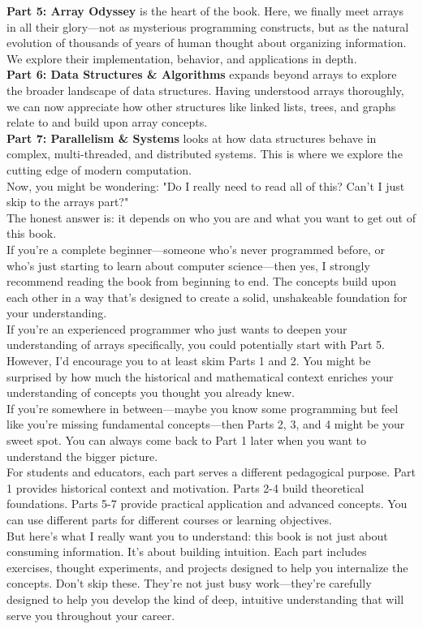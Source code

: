 \textbf{Part 5: Array Odyssey} is the heart of the book. Here, we finally meet arrays in all their glory—not as mysterious programming constructs, but as the natural evolution of thousands of years of human thought about organizing information. We explore their implementation, behavior, and applications in depth.\\
\textbf{Part 6: Data Structures \& Algorithms} expands beyond arrays to explore the broader landscape of data structures. Having understood arrays thoroughly, we can now appreciate how other structures like linked lists, trees, and graphs relate to and build upon array concepts.\\
\textbf{Part 7: Parallelism \& Systems} looks at how data structures behave in complex, multi-threaded, and distributed systems. This is where we explore the cutting edge of modern computation.\\
Now, you might be wondering: "Do I really need to read all of this? Can't I just skip to the arrays part?" \\
The honest answer is: it depends on who you are and what you want to get out of this book.\\
If you're a complete beginner—someone who's never programmed before, or who's just starting to learn about computer science—then yes, I strongly recommend reading the book from beginning to end. The concepts build upon each other in a way that's designed to create a solid, unshakeable foundation for your understanding.\\
If you're an experienced programmer who just wants to deepen your understanding of arrays specifically, you could potentially start with Part 5. However, I'd encourage you to at least skim Parts 1 and 2. You might be surprised by how much the historical and mathematical context enriches your understanding of concepts you thought you already knew.\\
If you're somewhere in between—maybe you know some programming but feel like you're missing fundamental concepts—then Parts 2, 3, and 4 might be your sweet spot. You can always come back to Part 1 later when you want to understand the bigger picture.\\
For students and educators, each part serves a different pedagogical purpose. Part 1 provides historical context and motivation. Parts 2-4 build theoretical foundations. Parts 5-7 provide practical application and advanced concepts. You can use different parts for different courses or learning objectives.\\
But here's what I really want you to understand: this book is not just about consuming information. It's about building intuition. Each part includes exercises, thought experiments, and projects designed to help you internalize the concepts. Don't skip these. They're not just busy work—they're carefully designed to help you develop the kind of deep, intuitive understanding that will serve you throughout your career.\\
